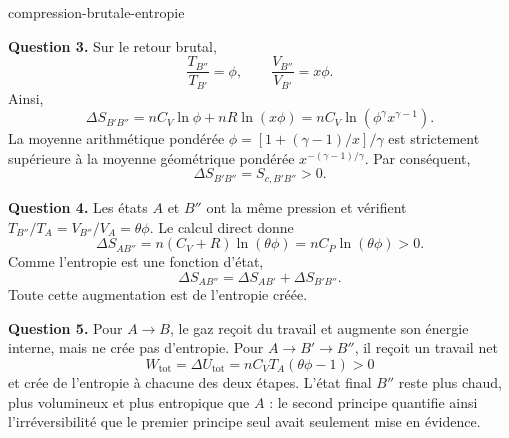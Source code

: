 \begin{exo}{compression-brutale-entropie}
\begin{solution}
\textbf{Question 3.} Sur le retour brutal,
\[
\frac{T_{B''}}{T_{B'}}=\phi,
\qquad
\frac{V_{B''}}{V_{B'}}=x\phi.
\]
Ainsi,
\[
\Delta S_{B'B''}
=nC_V\ln\phi+nR\ln(x\phi)
=nC_V\ln\left(\phi^\gamma x^{\gamma-1}\right).
\]
La moyenne arithmétique pondérée
$\phi=[1+(\gamma-1)/x]/\gamma$ est strictement supérieure à la moyenne
géométrique pondérée $x^{-(\gamma-1)/\gamma}$. Par conséquent,
\[
\Delta S_{B'B''}=S_{c,B'B''}>0.
\]

\textbf{Question 4.} Les états $A$ et $B''$ ont la même pression et vérifient
$T_{B''}/T_A=V_{B''}/V_A=\theta\phi$. Le calcul direct donne
\[
\Delta S_{AB''}
=n(C_V+R)\ln(\theta\phi)
=nC_P\ln(\theta\phi)>0.
\]
Comme l'entropie est une fonction d'état,
\[
\Delta S_{AB''}
=\Delta S_{AB'}+\Delta S_{B'B''}.
\]
Toute cette augmentation est de l'entropie créée.

\textbf{Question 5.} Pour $A\to B$, le gaz reçoit du travail et augmente son
énergie interne, mais ne crée pas d'entropie. Pour
$A\to B'\to B''$, il reçoit un travail net
\[
W_{\mathrm{tot}}=\Delta U_{\mathrm{tot}}
=nC_VT_A(\theta\phi-1)>0
\]
et crée de l'entropie à chacune des deux étapes. L'état final $B''$ reste plus
chaud, plus volumineux et plus entropique que $A$ : le second principe
quantifie ainsi l'irréversibilité que le premier principe seul avait seulement
mise en évidence.
\end{solution}
\end{exo}


